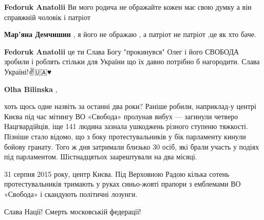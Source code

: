 \begin{itemize}
\begin{itemize}
\textbf{Fedoruk Anatolii} Ви мого родича не ображайте кожен має свою думку а він справжній чоловік і патріот

 
\textbf{Мар'яна Демчишин} , я його не ображаю , а патріот не патріот ,це як хто баче.

 
\textbf{Fedoruk Anatolii} це ти Слава Богу "прокинувся" Олег і його СВОБОДА зробили і роблять стільки для України що їх давно потрібно б нагородити.
Слава Україні!✌🇺🇦♥️

 
\textbf{Olha Bilinska} , 

хоть щось одне назвіть за останні два роки? Раніше робили, наприклад-у центрі
Києва під час мітингу ВО «Свобода» пролунав вибух — загинули четверо
Нацгвардійців, іще 141 людина зазнала ушкоджень різного ступеню тяжкості.
Пізніше стало відомо, що з боку протестувальників у бік парламенту кинули
бойову гранату. Того ж дня затримали близько 30 осіб, які брали участь у подіях
під парламентом. Шістнадцятьох заарештували на два місяці.

31 серпня 2015 року, центр Києва. Під Верховною Радою кілька сотень
протестувальників тримають у руках синьо-жовті прапори з емблемами ВО «Свобода»
і скандують політичні лозунги.

\end{itemize}

 
Слава Нації! Смерть московській федерації!


\end{itemize}
